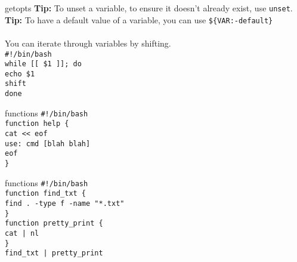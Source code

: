 \documentclass{beamer}
\let\tt\texttt
\let\bf\textbf
\begin{document}
\begin{frame}{getopts}
        \bf{Tip:} To unset a variable, to ensure it doesn't already exist, use \tt{unset}.      \\
        \bf{Tip:} To have a default value of a variable, you can use \tt{\$\{VAR:-default\}}    \\
        \quad                                           \\
        You can iterate through variables by shifting.  \\
        \tt{\#!/bin/bash}           \\
        \tt{while [[ \$1 ]]; do}    \\
        \quad \tt{echo \$1}         \\
        \quad \tt{shift}            \\
        \tt{done}                   \\
\end{frame}

\begin{frame}{functions}
        \tt{\#!/bin/bash}               \\
        \tt{function help \{ }      \\
        \quad \tt{cat << eof}       \\
        \tt{use: cmd [blah blah]}   \\
        \tt{eof}                    \\
        \tt{\}}                     \\
\end{frame}

\begin{frame}{functions}
        \tt{\#!/bin/bash}               \\
        \tt{function find\_txt \{ }                 \\
        \quad \tt{find . -type f -name "*.txt"}     \\
        \tt{\}}                                     \\
        \tt{function pretty\_print \{ }             \\
        \quad \tt{cat | nl}                         \\
        \tt{\}}                                     \\
        \tt{find\_txt | pretty\_print}              \\
\end{frame}
\end{document}
